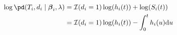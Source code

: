 \begin{align}
  \log\pd (T_{i}, d_{i} \mid \boldsymbol{\beta}_{i}, \lambda) &= \mathcal{I}(d_{i} = 1) \log(h_{i}(t)) + 
  \log(S_{i}(t)) \\
  &= \mathcal{I}(d_{i} = 1) \log(h_{i}(t)) - 
  \int_{0}^{t} h_{i}(u) \text{d}u
  \label{eqn:submodel-two-log-likelihood}
\end{align}
